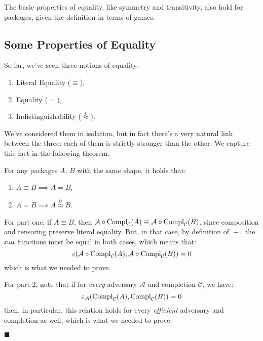 The basic properties of equality, like symmetry and transitivity,
also hold for packages, given the definition in terms of games.

\subsection{Some Properties of Equality}

So far, we've seen three notions of equality:
\begin{enumerate}
    \item Literal Equality ($\equiv$),
    \item Equality ($=$),
    \item Indistinguishability ($\overset{\epsilon}{\approx}$).
\end{enumerate}
We've considered them in isolation, but in fact there's
a very natural link between the three:
each of them is strictly stronger than the other.
We capture this fact in the following theorem.

\begin{lemma}
    For any packages $A$, $B$ with the same shape, it holds that:
    \begin{enumerate}
        \item $A \equiv B \implies A = B$,
        \item $A = B \implies A \overset{0}{\approx} B$.
    \end{enumerate}

     For part one, if $A \equiv B$, then
    $\mathcal{A} \circ \text{Compl}_{\mathcal{C}}(A) \equiv \mathcal{A} \circ \text{Compl}_{\mathcal{C}}(B)$, since
    composition and tensoring preserve literal equality.
    But, in that case, by definition of $\equiv$, the $\text{run}$
    functions must be equal in both cases, which means that:
    $$
    \varepsilon(\mathcal{A} \circ \text{Compl}_{\mathcal{C}}(A), \mathcal{A} \circ \text{Compl}_{\mathcal{C}}(B)) = 0
    $$
    which is what we needed to prove.

    For part 2, note that if for \emph{every} adversary $\mathcal{A}$
    and completion $\mathcal{C}$,
    we have:
    $$
    \varepsilon_{\mathcal{A}}(\text{Compl}_{\mathcal{C}}(A), \text{Compl}_{\mathcal{C}}(B)) = 0
    $$
    then, in particular, this relation holds for every \emph{efficient} adversary
    and completion as well, which is what we needed to prove.

    $\blacksquare$
\end{lemma}

